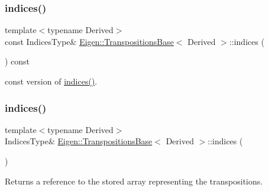 \subsubsection{\texorpdfstring{indices()}{indices()}\hspace{0.1cm}{\footnotesize\ttfamily [1/2]}}
{\footnotesize\ttfamily template$<$typename Derived$>$ \\
const Indices\+Type\& \mbox{\hyperlink{class_eigen_1_1_transpositions_base}{Eigen\+::\+Transpositions\+Base}}$<$ Derived $>$\+::indices (\begin{DoxyParamCaption}{ }\end{DoxyParamCaption}) const\hspace{0.3cm}{\ttfamily [inline]}}

const version of \mbox{\hyperlink{class_eigen_1_1_transpositions_base_a20eda0545eb00e887959f38b3a428a96}{indices()}}. \mbox{\label{class_eigen_1_1_transpositions_base_a20eda0545eb00e887959f38b3a428a96}} 
\subsubsection{\texorpdfstring{indices()}{indices()}\hspace{0.1cm}{\footnotesize\ttfamily [2/2]}}
{\footnotesize\ttfamily template$<$typename Derived$>$ \\
Indices\+Type\& \mbox{\hyperlink{class_eigen_1_1_transpositions_base}{Eigen\+::\+Transpositions\+Base}}$<$ Derived $>$\+::indices (\begin{DoxyParamCaption}{ }\end{DoxyParamCaption})\hspace{0.3cm}{\ttfamily [inline]}}

\begin{DoxyReturn}{Returns}
a reference to the stored array representing the transpositions. 
\end{DoxyReturn}
\mbox{\label{class_eigen_1_1_transpositions_base_affcac2f2ebcd5a8bf9067e20d3681d78}} 
